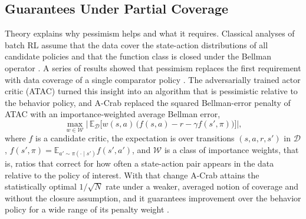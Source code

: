 \documentclass[conference]{IEEEtran}
\begin{document}
\subsection{Guarantees Under Partial Coverage}
Theory explains why pessimism helps and what it requires. Classical analyses of batch RL assume that the data cover the state-action distributions of all candidate policies and that the function class is closed under the Bellman operator \cite{chen2019information}. A series of results showed that pessimism replaces the first requirement with data coverage of a single comparator policy \cite{jin2021pessimism,rashidinejad2022bridging,xie2021bellman}. The adversarially trained actor critic (ATAC) \cite{cheng2022atac} turned this insight into an algorithm that is pessimistic relative to the behavior policy, and A-Crab \cite{zhu2023acrab} replaced the squared Bellman-error penalty of ATAC with an importance-weighted average Bellman error,
\begin{equation}
\max_{w \in \mathcal{W}} \Big|\, \mathbb{E}_{\mathcal{D}}\big[w(s,a)\,\big(f(s,a) - r - \gamma f(s',\pi)\big)\big] \Big|,
\label{eq:acrab}
\end{equation}
where $f$ is a candidate critic, the expectation is over transitions $(s,a,r,s')$ in $\mathcal{D}$, $f(s',\pi) = \mathbb{E}_{a' \sim \pi(\cdot \mid s')} f(s',a')$, and $\mathcal{W}$ is a class of importance weights, that is, ratios that correct for how often a state-action pair appears in the data relative to the policy of interest. With that change A-Crab attains the statistically optimal $1/\sqrt{N}$ rate under a weaker, averaged notion of coverage and without the closure assumption, and it guarantees improvement over the behavior policy for a wide range of its penalty weight \cite{zhu2023acrab}.
\end{document}
